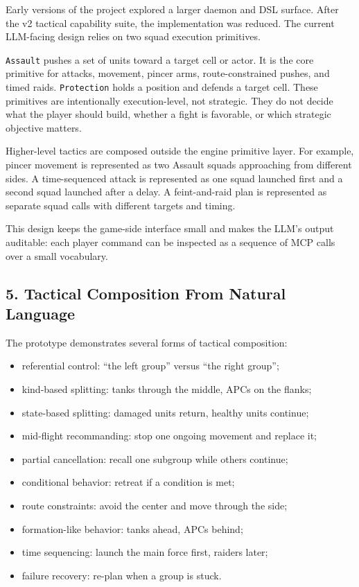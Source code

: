\documentclass[
  journal]{IEEEtran}
\providecommand{\tightlist}{%
  \setlength{\itemsep}{0pt}\setlength{\parskip}{0pt}}
\begin{document}
Early versions of the project explored a larger daemon and DSL surface.
After the v2 tactical capability suite, the implementation was reduced.
The current LLM-facing design relies on two squad execution primitives.

\texttt{Assault} pushes a set of units toward a target cell or actor. It
is the core primitive for attacks, movement, pincer arms,
route-constrained pushes, and timed raids. \texttt{Protection} holds a
position and defends a target cell. These primitives are intentionally
execution-level, not strategic. They do not decide what the player
should build, whether a fight is favorable, or which strategic objective
matters.

Higher-level tactics are composed outside the engine primitive layer.
For example, pincer movement is represented as two Assault squads
approaching from different sides. A time-sequenced attack is represented
as one squad launched first and a second squad launched after a delay. A
feint-and-raid plan is represented as separate squad calls with
different targets and timing.

This design keeps the game-side interface small and makes the LLM's
output auditable: each player command can be inspected as a sequence of
MCP calls over a small vocabulary.

\subsection{5. Tactical Composition From Natural
Language}\label{tactical-composition-from-natural-language}

The prototype demonstrates several forms of tactical composition:

\begin{itemize}
\tightlist
\item
  referential control: ``the left group'' versus ``the right group'';
\item
  kind-based splitting: tanks through the middle, APCs on the flanks;
\item
  state-based splitting: damaged units return, healthy units continue;
\item
  mid-flight recommanding: stop one ongoing movement and replace it;
\item
  partial cancellation: recall one subgroup while others continue;
\item
  conditional behavior: retreat if a condition is met;
\item
  route constraints: avoid the center and move through the side;
\item
  formation-like behavior: tanks ahead, APCs behind;
\item
  time sequencing: launch the main force first, raiders later;
\item
  failure recovery: re-plan when a group is stuck.
\end{itemize}
\end{document}
